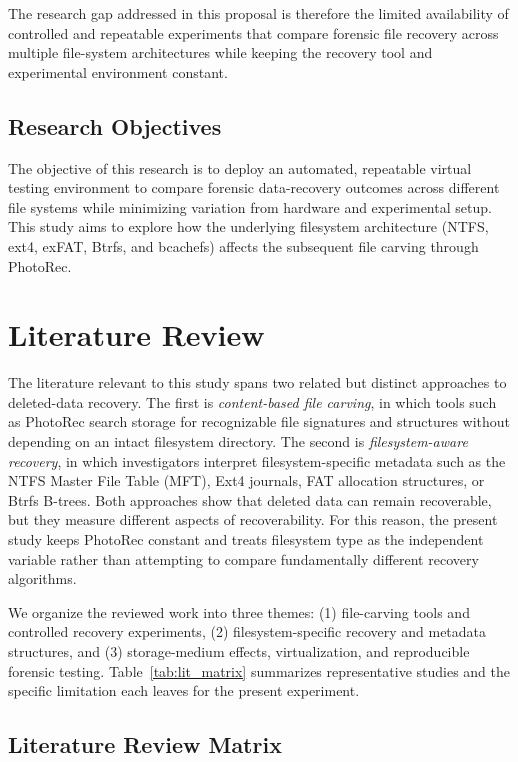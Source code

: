 \documentclass[conference]{IEEEtran}
\begin{document}
The research gap addressed in this proposal is therefore the limited availability of controlled and repeatable experiments that compare forensic file recovery across multiple file-system architectures while keeping the recovery tool and experimental environment constant.

\subsection{Research Objectives}

The objective of this research is to deploy an automated, repeatable virtual testing environment to compare forensic data-recovery outcomes across different file systems while minimizing variation from hardware and experimental setup. This study aims to explore how the underlying filesystem architecture (NTFS, ext4, exFAT, Btrfs, and bcachefs) affects the subsequent file carving through PhotoRec.


\section{Literature Review}

The literature relevant to this study spans two related but distinct approaches to deleted-data recovery. The first is \emph{content-based file carving}, in which tools such as PhotoRec search storage for recognizable file signatures and structures without depending on an intact filesystem directory. The second is \emph{filesystem-aware recovery}, in which investigators interpret filesystem-specific metadata such as the NTFS Master File Table (MFT), Ext4 journals, FAT allocation structures, or Btrfs B-trees. Both approaches show that deleted data can remain recoverable, but they measure different aspects of recoverability. For this reason, the present study keeps PhotoRec constant and treats filesystem type as the independent variable rather than attempting to compare fundamentally different recovery algorithms.

We organize the reviewed work into three themes: (1) file-carving tools and controlled recovery experiments, (2) filesystem-specific recovery and metadata structures, and (3) storage-medium effects, virtualization, and reproducible forensic testing. Table~\ref{tab:lit_matrix} summarizes representative studies and the specific limitation each leaves for the present experiment.

\subsection{Literature Review Matrix}
\end{document}
